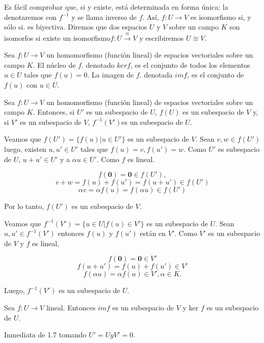 				Es fácil comprobar que, si y existe, está determinada en forma única; la denotaremos con $ f^{-1} $ y se llama inverso de $ f $. Así, $ f:U \rightarrow V  $ es isomorfismo si, y sólo si. es biyectiva. Diremos que dos espacios $ U $ y $ V $ sobre un campo $ K $ son isomorfos si existe un isomorfismo$ f:U \overset{\cong}{\rightarrow} V$ y escribiremos $ U \cong V $.
				
				\begin{defi}
					Sea $ f:U \rightarrow V  $ un homomorfismo (función lineal) de espacios vectoriales sobre un campo $ K $. El núcleo de $ f $. denotado $ ker f $, es el conjunto de todos los elementos $ u \in U $ tales que $ f(u) = 0 $. La imagen de $ f $. denotada $ im f $, es el conjunto de $ f(u) $ con $u \in U $.
				\end{defi}
			
				\begin{pro}
					Sea  $ f:U \rightarrow V $ un homomorfismo (función lineal)
					de espacios vectoriales sobre un campo $ K $. Entonces, si $ U' $ es un subespacio de $ U $, $ f(U) $	es un subespacio de $ V $ y, si $ V' $ es un subespacio de $ V $, $ f^{-1}( V') $es un subespacio de $ U $.
				\end{pro}
				\begin{demo}
					Veamos que $ f(U') = \{f(u)|u \in U'\} $ es un subespacio de $ V $. Sean $ v,w \in f(U') $ luego, existen $ u, u' \in U' $ tales que $ f(u) = v, f(u') = w $. Como $ U' $ es subespacio de $ U $, $ u + u' \in  U' $ y a $ \alpha u \in U' $. Como $ f $ es lineal.
					
					\[ f(\mathbf{0}) = \mathbf{0} \in f(U'),\] 
					\[ 	v+w = f(u)+f(u')=f(u+u') \in f(U') \]
					\[ \alpha v = \alpha f(u) = f(\alpha u) \in f(U')\]
				\end{demo}
				Por lo tanto, $ f(U') $ es un subespacio de $ V $.
				
				Veamos que $ f^{-1}(V') = \{u \in U|f(u) \in V'\}$ es un subespacio de $ U $. Sean $ u,u' \in f^{-1}(V')$ entonces $ f(u) $ y $ f(u') $ están en $ V' $. Como $ V' $ es un subespacio de $ V $ y $ f $ es lineal,
				
				\[ f(\mathbf{0}) = \mathbf{0} \in V'\]
				\[ f(u + u') = f(u) + f(u') \in V'\]
				\[ f(\alpha u) = \alpha f(u) \in V', \alpha \in K. \]
				
				Luego,	$ f^{-1}(V') $ es un subespacio de $ U $.
				
				\begin{coro}
					Sea $ f:U \rightarrow V $ lineal. Entonces $ im f $ es un subespacio de $ V $ y ker $ f $ es un subespacio de $ U $.
				\end{coro}
				\begin{demo}
					Inmediata de 1.7 tomando $ U' = U y V' = 0 $.
				\end{demo}
			
